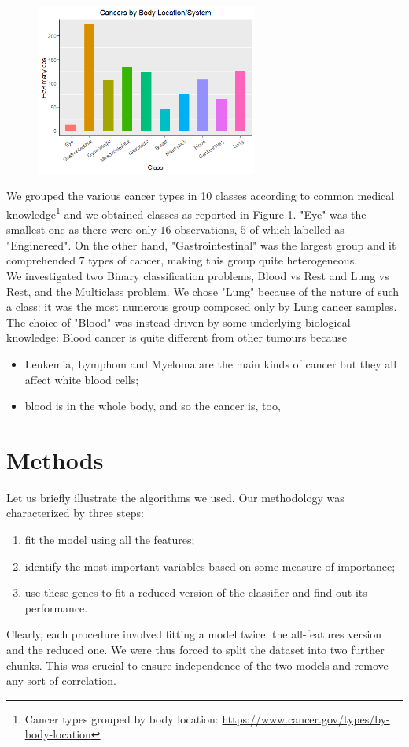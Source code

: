 \documentclass[a4paper,11pt, oneside]{article}  %
\begin{document}
\begin{figure}
	\includegraphics[width=0.65\textwidth]{plot1.png}
	\label{fig1}
\end{figure}
We grouped the various cancer types in 10 classes according to common medical knowledge\footnote{Cancer types grouped by body location: \url{https://www.cancer.gov/types/by-body-location}} and we obtained classes as reported in Figure \ref{fig1}.  "Eye" was the smallest one as there were only $16$ observations, $5$ of which labelled as "Enginereed". On the other hand, "Gastrointestinal" was the largest group and it comprehended $7$ types of cancer,  making this group quite heterogeneous. \\
We investigated two Binary classification problems, Blood vs Rest and Lung vs Rest, and the Multiclass problem. We chose "Lung" because of the nature of such a class: it was the most numerous group composed only by Lung cancer samples. The choice of "Blood" was instead driven by some underlying biological knowledge: Blood cancer is quite different from other tumours because
\begin{itemize}
	\item Leukemia, Lymphom and Myeloma are the main kinds of cancer but they all affect white blood cells;
	\item blood is in the whole body, and so the cancer is, too,	
\end{itemize} 

\section{Methods}
Let us briefly illustrate the algorithms we used. Our methodology was characterized by three steps:
\begin{enumerate}
	\item fit the model using all the features;
	\item identify the most important variables based on some measure of importance;
	\item use these genes to fit a reduced version of the classifier and find out its performance.
\end{enumerate}
Clearly, each procedure involved fitting a model twice: the all-features version and the reduced one. We were thus forced to split the dataset into two further chunks. This was crucial to ensure independence of the two models and remove any sort of correlation.
\end{document}

